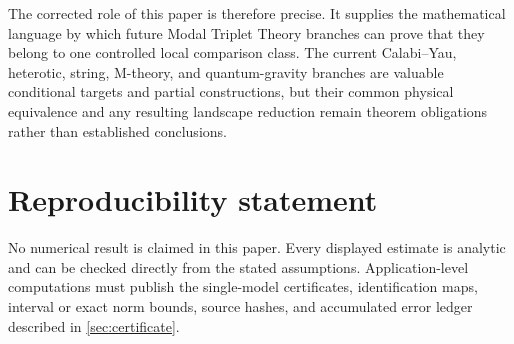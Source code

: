 \documentclass[11pt]{article}
\theoremstyle{definition}
\theoremstyle{remark}
\newcommand{\1}{\mathbf 1}
\newcommand{\MTT}{Modal Triplet Theory}
\begin{document}
The corrected role of this paper is therefore precise.  It supplies the
mathematical language by which future \MTT{} branches can prove that they
belong to one controlled local comparison class.  The current
Calabi--Yau, heterotic, string, M-theory, and quantum-gravity branches are
valuable conditional targets and partial constructions, but their common
physical equivalence and any resulting landscape reduction remain theorem
obligations rather than established conclusions.

\section*{Reproducibility statement}

No numerical result is claimed in this paper.  Every displayed estimate is
analytic and can be checked directly from the stated assumptions.
Application-level computations must publish the single-model certificates,
identification maps, interval or exact norm bounds, source hashes, and
accumulated error ledger described in \cref{sec:certificate}.



\end{document}
